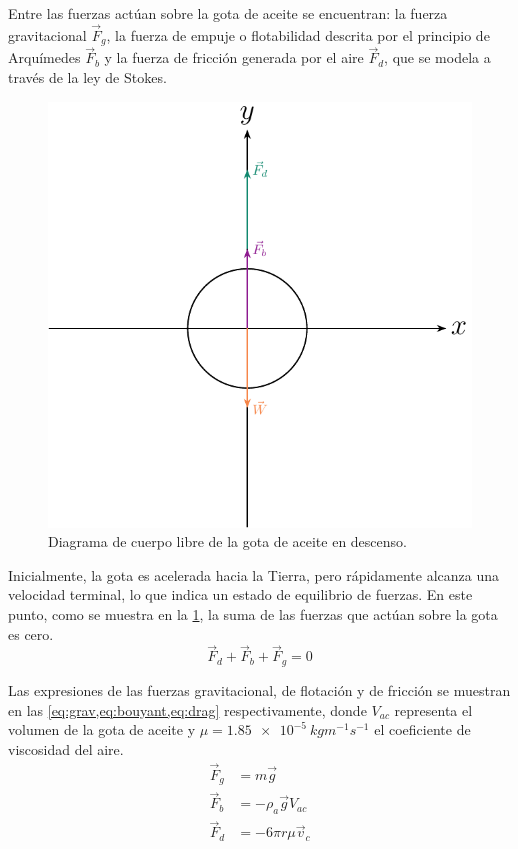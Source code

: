 Entre las fuerzas actúan sobre la gota de aceite se encuentran: la fuerza
gravitacional $\vec{F}_g$, la fuerza de empuje o flotabilidad descrita
por el principio de Arquímedes $\vec{F}_b$ y la fuerza de fricción generada
por el aire $\vec{F}_d$, que se modela a través de la ley de Stokes.

\begin{figure}[htbp!]
    \centering
    \includegraphics[width=0.8\linewidth]{./images/free-body-diagram-falling.pdf}
    \caption{Diagrama de cuerpo libre de la gota de aceite en descenso.}
    \label{fig:fbd-falling-drop}
\end{figure}

Inicialmente, la gota es acelerada hacia la Tierra, pero rápidamente
alcanza una velocidad terminal, lo que indica un estado de equilibrio de fuerzas.
En este punto, como se muestra en la \cref{fig:fbd-falling-drop}, la suma de
las fuerzas que actúan sobre la gota es cero.
\begin{equation}\label{eq:equilibrium-1}
    \vec{F}_d + \vec{F}_b + \vec{F}_g = 0
\end{equation}

Las expresiones de las fuerzas gravitacional, de flotación y de fricción se
muestran en las \cref{eq:grav,eq:bouyant,eq:drag} respectivamente, donde
\( V_{ac} \) representa el volumen de la gota de aceite y
\( \mu = \qty{1.85e-5}{kgm^{-1}s^{-1}} \) el coeficiente de viscosidad del aire.
\begin{align}
    \vec{F}_g &= m\vec{g} \label{eq:grav} \\
    \vec{F}_b &= -\rho_a \vec{g}V_{ac} \label{eq:bouyant} \\
    \vec{F}_d &= -6\pi r\mu \vec{v}_c \label{eq:drag}
\end{align}

